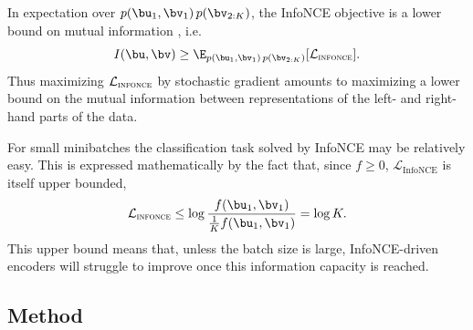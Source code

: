 In expectation over $p(\bu_1,\bv_1)\,p(\bv_{2:K})$, the InfoNCE objective is a lower bound on mutual information \cite{poole2019variational}, i.e.
\begin{equation}
I(\bu,\bv) \ge \E_{p(\bu_1,\bv_1)\,p(\bv_{2:K})}[\mathcal{L}_\textsc{infonce}].
\end{equation}
Thus maximizing $\mathcal{L}_\textsc{infonce}$ by stochastic gradient amounts to maximizing a lower bound on the mutual information between representations of the left- and right-hand parts of the data.

For small minibatches the classification task solved by InfoNCE may be relatively easy.
This is expressed mathematically by the fact that, since $f\ge 0$, $\mathcal{L}_\text{InfoNCE}$ is itself upper bounded,
\begin{equation}
\mathcal{L}_\textsc{infonce} \le \log \frac{f(\bu_1,\bv_1)}{\frac{1}{K} f(\bu_1, \bv_1)} = \log K.
\end{equation}
This upper bound means that, unless the batch size is large, InfoNCE-driven encoders will struggle to improve once this information capacity is reached.

\subsection{Method}



